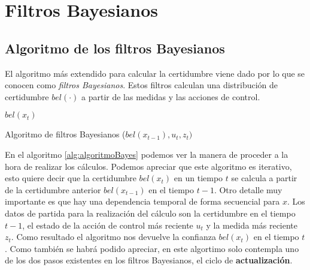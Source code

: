 \section{Filtros Bayesianos} \label{sec:filtros_bayes}
\subsection{Algoritmo de los filtros Bayesianos}
El algoritmo más extendido para calcular la certidumbre viene dado por lo que se conocen como \textit{filtros Bayesianos}.
Estos filtros calculan una distribución de certidumbre $bel(\cdot)$ a partir de las medidas y las acciones de control.
\begin{algorithm}
\begin{algorithmic} [1]
\ENDFOR
\RETURN $bel(x_{t})$
\end{algorithmic}
\caption{Algoritmo de filtros Bayesianos \cite{thrun_probabilistic_2005} ($bel(x_{t-1}),u_{t},z_{t})$}\label{alg:algoritmoBayes}
\end{algorithm}

En el algoritmo \ref{alg:algoritmoBayes} podemos ver la manera de proceder a la hora de realizar los cálculos. 
%
%
%
%
%
%
%
Podemos apreciar que este algoritmo es iterativo, esto quiere decir que la certidumbre $bel(x_{t})$ en un tiempo $t$ se calcula a partir de la certidumbre anterior $bel(x_{t-1})$ en el tiempo $t-1$. Otro detalle muy importante es que hay una dependencia temporal de forma secuencial para $x$.
%
%
%
Los datos de partida para la realización del cálculo son la certidumbre en el tiempo $t-1$, el estado de la acción de control más  reciente $u_{t}$ y la medida más reciente $z_{t}$.
Como resultado el algoritmo nos devuelve la confianza $bel(x_{t})$ en el tiempo $t$.
Como también se habrá podido apreciar, en este algortimo solo contempla uno de los dos pasos existentes en los filtros Bayesianos, el ciclo de \textbf{actualización}.

